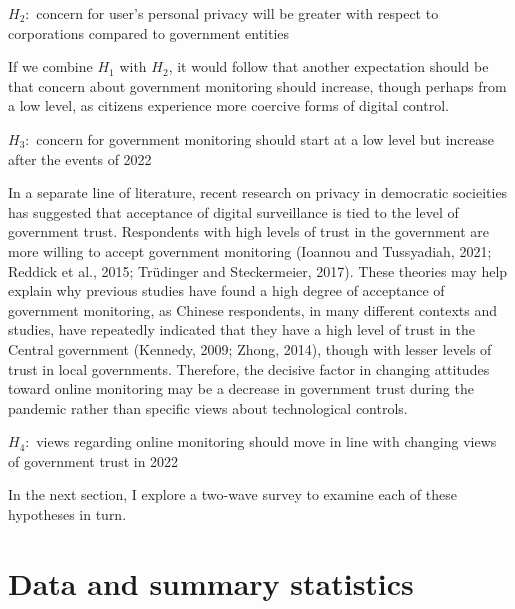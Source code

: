 \documentclass[
  letterpaper,
  DIV=11,
  numbers=noendperiod]{scrartcl}
\begin{document}
\(H_2:\) concern for user's personal privacy will be greater with
respect to corporations compared to government entities

If we combine \(H_1\) with \(H_2\), it would follow that another
expectation should be that concern about government monitoring should
increase, though perhaps from a low level, as citizens experience more
coercive forms of digital control.

\(H_3:\) concern for government monitoring should start at a low level
but increase after the events of 2022

In a separate line of literature, recent research on privacy in
democratic socieities has suggested that acceptance of digital
surveillance is tied to the level of government trust. Respondents with
high levels of trust in the government are more willing to accept
government monitoring (Ioannou and Tussyadiah, 2021; Reddick et al.,
2015; Trüdinger and Steckermeier, 2017). These theories may help explain
why previous studies have found a high degree of acceptance of
government monitoring, as Chinese respondents, in many different
contexts and studies, have repeatedly indicated that they have a high
level of trust in the Central government (Kennedy, 2009; Zhong, 2014),
though with lesser levels of trust in local governments. Therefore, the
decisive factor in changing attitudes toward online monitoring may be a
decrease in government trust during the pandemic rather than specific
views about technological controls.

\(H_4:\) views regarding online monitoring should move in line with
changing views of government trust in 2022

In the next section, I explore a two-wave survey to examine each of
these hypotheses in turn.

\hypertarget{sec-datasummary}{%
\section{Data and summary statistics}\label{sec-datasummary}}
\end{document}
